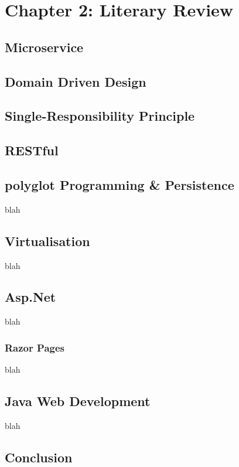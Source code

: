 \section{Chapter 2: Literary Review}
	\subsection{Microservice}
		
	\pagebreak
	\subsection{Domain Driven Design}
	
	\pagebreak
	\subsection{Single-Responsibility Principle}
	
	\pagebreak
	\subsection{RESTful}
	
	\pagebreak
	\subsection{polyglot Programming \& Persistence}
	blah
	\pagebreak
	\subsection{Virtualisation}
	blah
	\pagebreak
	\subsection{Asp.Net}
	blah
		\subsubsection{Razor Pages}
		blah
	\pagebreak
		\subsection{Java Web Development}
	blah
	\pagebreak
	\subsection{Conclusion}
